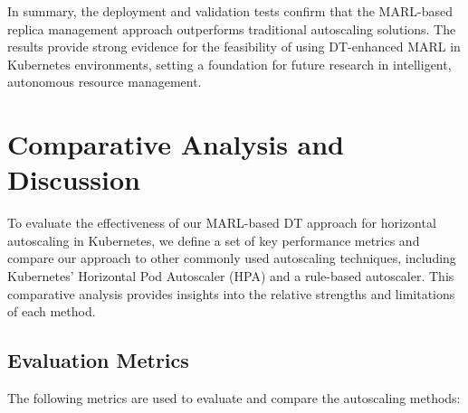 \documentclass[conference]{IEEEtran}
\begin{document}
In summary, the deployment and validation tests confirm that the MARL-based replica management approach outperforms traditional autoscaling solutions. The results provide strong evidence for the feasibility of using DT-enhanced MARL in Kubernetes environments, setting a foundation for future research in intelligent, autonomous resource management.


\section{Comparative Analysis and Discussion}
\label{sec:results}

To evaluate the effectiveness of our MARL-based DT approach for horizontal autoscaling in Kubernetes, we define a set of key performance metrics and compare our approach to other commonly used autoscaling techniques, including Kubernetes' Horizontal Pod Autoscaler (HPA) and a rule-based autoscaler. This comparative analysis provides insights into the relative strengths and limitations of each method.

\subsection{Evaluation Metrics}

The following metrics are used to evaluate and compare the autoscaling methods:
\end{document}
